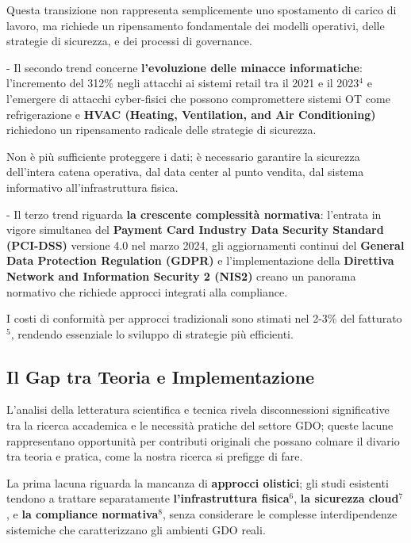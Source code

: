\documentclass[12pt,a4paper,oneside]{book}
\numberwithin{figure}{chapter} %
\numberwithin{table}{chapter}  %
\begin{document}
Questa transizione non rappresenta semplicemente uno spostamento di
carico di lavoro, ma richiede un ripensamento fondamentale dei modelli
operativi, delle strategie di sicurezza, e dei processi di governance.

- Il secondo trend concerne \textbf{l'evoluzione delle minacce
informatiche}: l'incremento del 312\% negli attacchi ai sistemi retail
tra il 2021 e il 2023$^4$ e l'emergere di attacchi cyber-fisici che possono
compromettere sistemi OT come refrigerazione e \textbf{HVAC (Heating,
Ventilation, and Air Conditioning)} richiedono un ripensamento radicale
delle strategie di sicurezza.

Non è più sufficiente proteggere i dati; è necessario garantire la
sicurezza dell'intera catena operativa, dal data center al punto
vendita, dal sistema informativo all'infrastruttura fisica.

- Il terzo trend riguarda \textbf{la crescente complessità normativa}:
l'entrata in vigore simultanea del \textbf{Payment Card Industry Data
Security Standard (PCI-DSS)} versione 4.0 nel marzo 2024, gli
aggiornamenti continui del \textbf{General Data Protection Regulation
(GDPR)} e l'implementazione della \textbf{Direttiva Network and
Information Security 2 (NIS2)} creano un panorama normativo che richiede
approcci integrati alla compliance.

I costi di conformità per approcci tradizionali sono stimati nel 2-3\%
del fatturato$^5$, rendendo essenziale lo sviluppo di strategie più
efficienti.

\subsection{\texorpdfstring{\textbf{Il Gap tra Teoria e
Implementazione}}{1.1.3 Il Gap tra Teoria e Implementazione}}\label{il-gap-tra-teoria-e-implementazione}

L'analisi della letteratura scientifica e tecnica rivela disconnessioni
significative tra la ricerca accademica e le necessità pratiche del
settore GDO; queste lacune rappresentano opportunità per contributi
originali che possano colmare il divario tra teoria e pratica, come la nostra ricerca si prefigge di fare.

La prima lacuna riguarda la mancanza di \textbf{approcci olistici}; gli studi
esistenti tendono a trattare separatamente \textbf{l'infrastruttura fisica}$^6$, \textbf{la
sicurezza cloud}$^7$, e \textbf{la compliance normativa}$^8$, senza considerare le
complesse interdipendenze sistemiche che caratterizzano gli ambienti GDO
reali.
\end{document}
